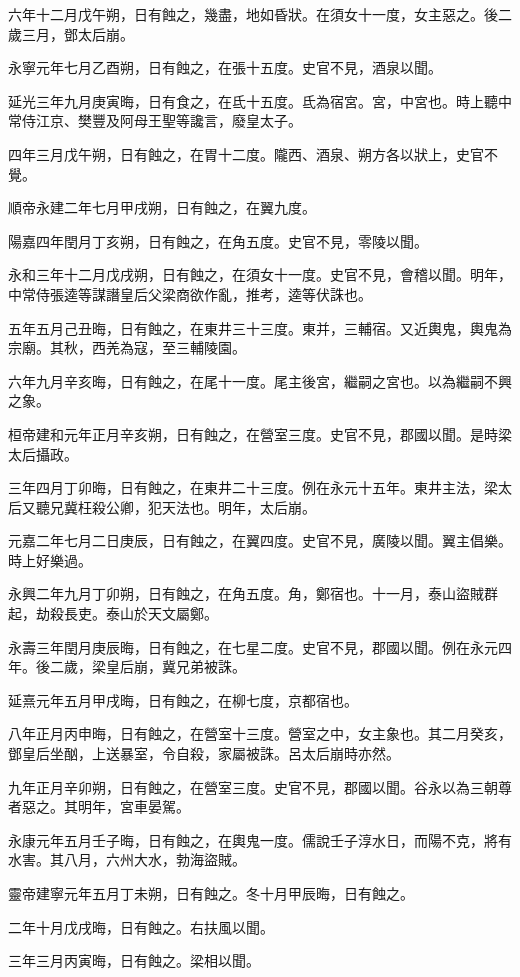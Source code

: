 \begin{pinyinscope}
六年十二月戊午朔，日有蝕之，幾盡，地如昏狀。在須女十一度，女主惡之。後二歲三月，鄧太后崩。

永寧元年七月乙酉朔，日有蝕之，在張十五度。史官不見，酒泉以聞。

延光三年九月庚寅晦，日有食之，在氐十五度。氐為宿宮。宮，中宮也。時上聽中常侍江京、樊豐及阿母王聖等讒言，廢皇太子。

四年三月戊午朔，日有蝕之，在胃十二度。隴西、酒泉、朔方各以狀上，史官不覺。

順帝永建二年七月甲戌朔，日有蝕之，在翼九度。

陽嘉四年閏月丁亥朔，日有蝕之，在角五度。史官不見，零陵以聞。

永和三年十二月戊戌朔，日有蝕之，在須女十一度。史官不見，會稽以聞。明年，中常侍張逵等謀譖皇后父梁商欲作亂，推考，逵等伏誅也。

五年五月己丑晦，日有蝕之，在東井三十三度。東并，三輔宿。又近輿鬼，輿鬼為宗廟。其秋，西羌為寇，至三輔陵園。

六年九月辛亥晦，日有蝕之，在尾十一度。尾主後宮，繼嗣之宮也。以為繼嗣不興之象。

桓帝建和元年正月辛亥朔，日有蝕之，在營室三度。史官不見，郡國以聞。是時梁太后攝政。

三年四月丁卯晦，日有蝕之，在東井二十三度。例在永元十五年。東井主法，梁太后又聽兄冀枉殺公卿，犯天法也。明年，太后崩。

元嘉二年七月二日庚辰，日有蝕之，在翼四度。史官不見，廣陵以聞。翼主倡樂。時上好樂過。

永興二年九月丁卯朔，日有蝕之，在角五度。角，鄭宿也。十一月，泰山盜賊群起，劫殺長吏。泰山於天文屬鄭。

永壽三年閏月庚辰晦，日有蝕之，在七星二度。史官不見，郡國以聞。例在永元四年。後二歲，梁皇后崩，冀兄弟被誅。

延熹元年五月甲戌晦，日有蝕之，在柳七度，京都宿也。

八年正月丙申晦，日有蝕之，在營室十三度。營室之中，女主象也。其二月癸亥，鄧皇后坐酗，上送暴室，令自殺，家屬被誅。呂太后崩時亦然。

九年正月辛卯朔，日有蝕之，在營室三度。史官不見，郡國以聞。谷永以為三朝尊者惡之。其明年，宮車晏駕。

永康元年五月壬子晦，日有蝕之，在輿鬼一度。儒說壬子淳水日，而陽不克，將有水害。其八月，六州大水，勃海盜賊。

靈帝建寧元年五月丁未朔，日有蝕之。冬十月甲辰晦，日有蝕之。

二年十月戊戌晦，日有蝕之。右扶風以聞。

三年三月丙寅晦，日有蝕之。梁相以聞。


\end{pinyinscope}
